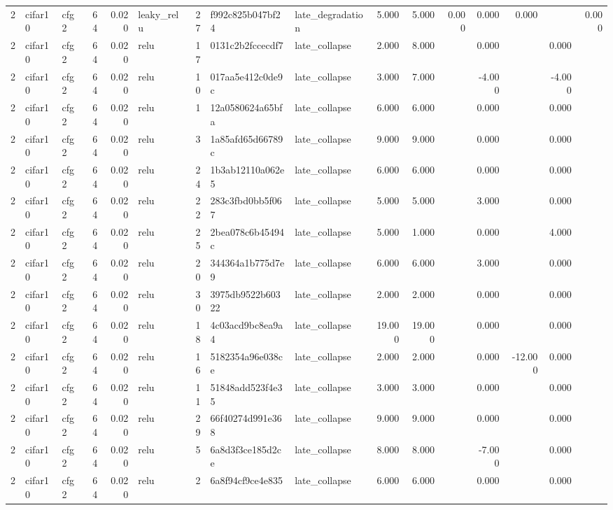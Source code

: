\begin{table}[htbp]
{\begin{tabular}{@{}rllrrlrllrrrrrrr@{}}
2 & cifar10 & cfg2 & 64 & 0.020 & leaky\_relu & 27 & f992c825b047bf24 & late\_degradation & 5.000 & 5.000 & 0.000 & 0.000 & 0.000 &  & 0.000 \\
2 & cifar10 & cfg2 & 64 & 0.020 & relu & 17 & 0131c2b2fccecdf7 & late\_collapse & 2.000 & 8.000 &  & 0.000 &  & 0.000 &  \\
2 & cifar10 & cfg2 & 64 & 0.020 & relu & 10 & 017aa5e412c0de9c & late\_collapse & 3.000 & 7.000 &  & -4.000 &  & -4.000 &  \\
2 & cifar10 & cfg2 & 64 & 0.020 & relu & 1 & 12a0580624a65bfa & late\_collapse & 6.000 & 6.000 &  & 0.000 &  & 0.000 &  \\
2 & cifar10 & cfg2 & 64 & 0.020 & relu & 3 & 1a85afd65d66789c & late\_collapse & 9.000 & 9.000 &  & 0.000 &  & 0.000 &  \\
2 & cifar10 & cfg2 & 64 & 0.020 & relu & 24 & 1b3ab12110a062e5 & late\_collapse & 6.000 & 6.000 &  & 0.000 &  & 0.000 &  \\
2 & cifar10 & cfg2 & 64 & 0.020 & relu & 22 & 283c3fbd0bb5f067 & late\_collapse & 5.000 & 5.000 &  & 3.000 &  & 0.000 &  \\
2 & cifar10 & cfg2 & 64 & 0.020 & relu & 25 & 2bea078c6b45494c & late\_collapse & 5.000 & 1.000 &  & 0.000 &  & 4.000 &  \\
2 & cifar10 & cfg2 & 64 & 0.020 & relu & 20 & 344364a1b775d7e9 & late\_collapse & 6.000 & 6.000 &  & 3.000 &  & 0.000 &  \\
2 & cifar10 & cfg2 & 64 & 0.020 & relu & 30 & 3975db9522b60322 & late\_collapse & 2.000 & 2.000 &  & 0.000 &  & 0.000 &  \\
2 & cifar10 & cfg2 & 64 & 0.020 & relu & 18 & 4c03acd9bc8ea9a4 & late\_collapse & 19.000 & 19.000 &  & 0.000 &  & 0.000 &  \\
2 & cifar10 & cfg2 & 64 & 0.020 & relu & 16 & 5182354a96e038ce & late\_collapse & 2.000 & 2.000 &  & 0.000 & -12.000 & 0.000 &  \\
2 & cifar10 & cfg2 & 64 & 0.020 & relu & 11 & 51848add523f4e35 & late\_collapse & 3.000 & 3.000 &  & 0.000 &  & 0.000 &  \\
2 & cifar10 & cfg2 & 64 & 0.020 & relu & 29 & 66f40274d991e368 & late\_collapse & 9.000 & 9.000 &  & 0.000 &  & 0.000 &  \\
2 & cifar10 & cfg2 & 64 & 0.020 & relu & 5 & 6a8d3f3ce185d2ce & late\_collapse & 8.000 & 8.000 &  & -7.000 &  & 0.000 &  \\
2 & cifar10 & cfg2 & 64 & 0.020 & relu & 2 & 6a8f94cf9ce4e835 & late\_collapse & 6.000 & 6.000 &  & 0.000 &  & 0.000 &  \\

\end{tabular}}
\end{table}

